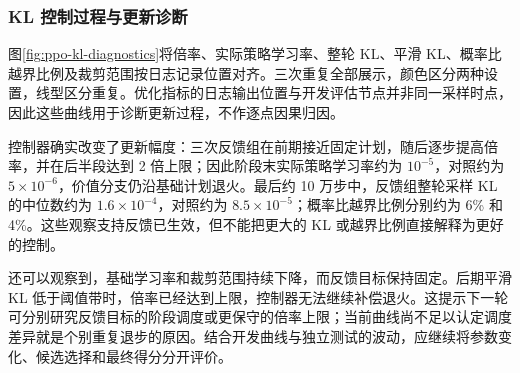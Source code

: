 \subsubsection{KL 控制过程与更新诊断}
图\ref{fig:ppo-kl-diagnostics}将倍率、实际策略学习率、整轮 KL、平滑 KL、概率比越界比例及裁剪范围按日志记录位置对齐。三次重复全部展示，颜色区分两种设置，线型区分重复。优化指标的日志输出位置与开发评估节点并非同一采样时点，因此这些曲线用于诊断更新过程，不作逐点因果归因。


\FloatBarrier
控制器确实改变了更新幅度：三次反馈组在前期接近固定计划，随后逐步提高倍率，并在后半段达到 2 倍上限；因此阶段末实际策略学习率约为 $10^{-5}$，对照约为 $5\times10^{-6}$，价值分支仍沿基础计划退火。最后约 10 万步中，反馈组整轮采样 KL 的中位数约为 $1.6\times10^{-4}$，对照约为 $8.5\times10^{-5}$；概率比越界比例分别约为 6\% 和 4\%。这些观察支持反馈已生效，但不能把更大的 KL 或越界比例直接解释为更好的控制。

还可以观察到，基础学习率和裁剪范围持续下降，而反馈目标保持固定。后期平滑 KL 低于阈值带时，倍率已经达到上限，控制器无法继续补偿退火。这提示下一轮可分别研究反馈目标的阶段调度或更保守的倍率上限；当前曲线尚不足以认定调度差异就是个别重复退步的原因。结合开发曲线与独立测试的波动，应继续将参数变化、候选选择和最终得分分开评价。

\FloatBarrier
